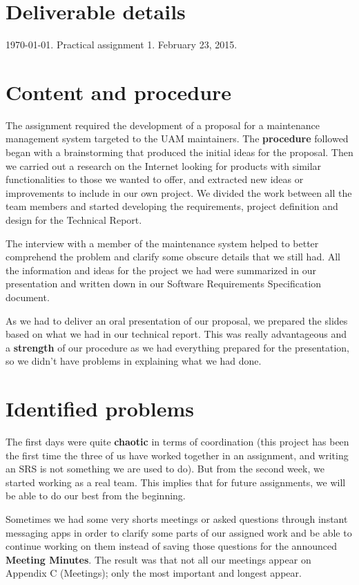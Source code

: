 
\section{Deliverable details}

\noindent
{} \today.
 Practical assignment 1.
 February 23, 2015.

\section{Content and procedure}

The assignment required the development of a proposal for a maintenance management system targeted to the UAM maintainers. The \textbf{procedure} followed began with a brainstorming that produced the initial ideas for the proposal. Then we carried out a research on the Internet looking for products with similar functionalities to those we wanted to offer, and extracted new ideas or improvements to include in our own project. We divided the work between all the team members and started developing the requirements, project definition and design for the Technical Report.

The interview with a member of the maintenance system helped to better comprehend the problem and clarify some obscure details that we still had. All the information and ideas for the project we had were summarized in our presentation and written down in our Software Requirements Specification document.

As we had to deliver an oral presentation of our proposal, we prepared the slides based on what we had in our technical report. This was really advantageous and a \textbf{strength} of our procedure as we had everything prepared for the presentation, so we didn't have problems in explaining what we had done.

\section{Identified problems}

The first days were quite \textbf{chaotic} in terms of coordination (this project has been the first time the three of us have worked together in an assignment, and writing an SRS is not something we are used to do). But from the second week, we started working as a real team. This implies that for future assignments, we will be able to do our best from the beginning.

Sometimes we had some very shorts meetings or asked questions through instant messaging apps in order to clarify some parts of our assigned work and be able to continue working on them instead of saving those questions for the announced \textbf{Meeting Minutes}. The result was that not all our meetings appear on Appendix C (Meetings); only the most important and longest appear.

